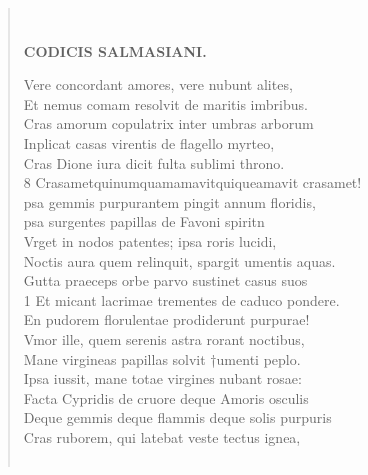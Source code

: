 \documentclass[11pt, a4paper]{report}
\begin{document}
\begin{verse}
        ﻿\pagebreak 
    \begin{center} \textbf{CODICIS SALMASIANI.} \end{center}Vere concordant amores, vere nubunt alites, \\ Et nemus comam resolvit de maritis imbribus. \\ Cras amorum copulatrix inter umbras arborum \\ Inplicat casas virentis de flagello myrteo, \\ Cras Dione iura dicit fulta sublimi throno. \\ 8 Crasametquinumquamamavitquiqueamavit crasamet! \\ psa gemmis purpurantem pingit annum floridis, \\ psa surgentes papillas de Favoni spiritn \\ Vrget in nodos patentes; ipsa roris lucidi, \\ Noctis aura quem relinquit, spargit umentis aquas. \\ Gutta praeceps orbe parvo sustinet casus suos \\ 1 Et micant lacrimae trementes de caduco pondere. \\ En pudorem florulentae prodiderunt purpurae! \\ Vmor ille, quem serenis astra rorant noctibus, \\ Mane virgineas papillas solvit †umenti peplo. \\ Ipsa iussit, mane totae virgines nubant rosae: \\ Facta Cypridis de cruore deque Amoris osculis \\ Deque gemmis deque flammis deque solis purpuris \\ Cras ruborem, qui latebat veste tectus ignea, \\ 
        ﻿\pagebreak 

\end{verse}
\end{document}
